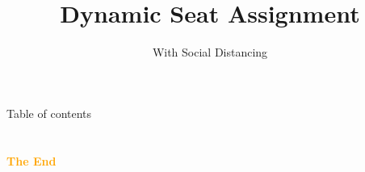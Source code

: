 \documentclass[aspectratio=43]{beamer}
\title{Dynamic Seat Assignment} %
\subtitle{With Social Distancing}
\institute[HKUST]{
    IEDA%
    \\%
    The Hong Kong University of Science and Technology%
} %
\date{}
\begin{document}
    \frame{\titlepage}
    \begin{frame}{Table of contents}
        \tableofcontents
    \end{frame}
    
    
    
    
    


    \section{}
    \begin{frame}{}
        \centering
            \Huge\bfseries
        \textcolor{orange}{The End}
    \end{frame}
\end{document}
